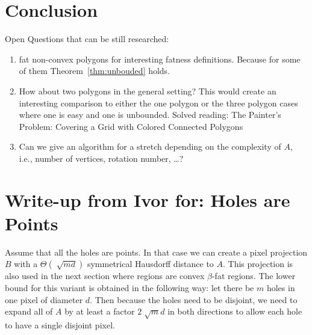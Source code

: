 \documentclass[a4paper, UKenglish]{lipics-v2018}
\begin{document}



\section{Conclusion} %
\label{sec:conclusion}

Open Questions that can be still researched:
\begin{enumerate}
	\item fat non-convex polygons for interesting fatness definitions. Because for some of them Theorem~\ref{thm:unbouded} holds.
	\item How about two polygons in the general setting? This would create an interesting comparison to either the one polygon or the three polygon cases where one is easy and one is unbounded.
	Solved reading: The Painter’s Problem: Covering a Grid with Colored Connected Polygons
	\item Can we give an algorithm for a stretch depending on the complexity of $A$, i.e., number of vertices, rotation number, \dots?
\end{enumerate}


\newpage
\appendix



\section{Write-up from Ivor for: Holes are Points}



Assume that all the holes are points. In that case we can create a pixel projection $B$ with a $\Theta(\sqrt[]{md})$ symmetrical Hausdorff distance to $A$. This projection is also used in the next section where regions are convex $\beta$-fat regions.  The lower bound for this variant is obtained in the following way: let there be $m$ holes in one pixel of diameter $d$. Then because the holes need to be disjoint, we need to expand all of $A$ by at least a factor $2\sqrt[]{m}d$ in both directions to allow each hole to have a single disjoint pixel.
\end{document}
